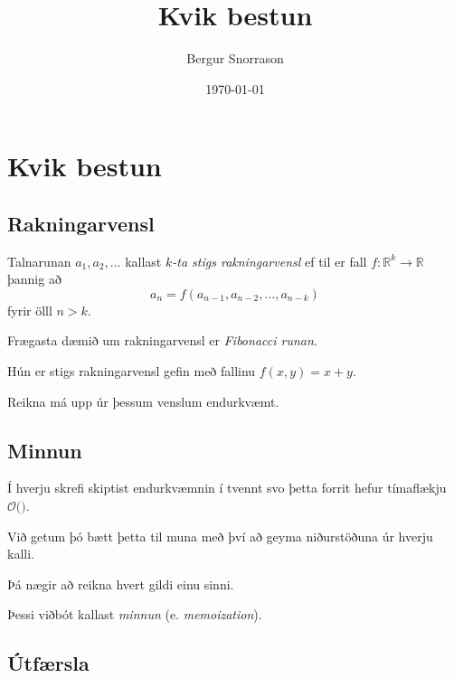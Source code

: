 \title{Kvik bestun}
\author{Bergur Snorrason}
\date{\today}



\frame{\titlepage}

\section{Kvik bestun}
\subsection{Rakningarvensl}
{
    {
        \item<1-> Talnarunan $a_1, a_2, ...$ kallast \emph{$k$-ta stigs rakningarvensl} ef til er fall
            $f \colon \mathbb{R}^k \rightarrow \mathbb{R}$ þannig að
            \[
            a_n = f(a_{n - 1}, a_{n - 2}, ..., a_{n - k})
                \]
                fyrir ölll $n > k$.
        \item<2-> Frægasta dæmið um rakningarvensl er \emph{Fibonacci runan}.
        \item<3-> Hún er  stigs rakningarvensl gefin með fallinu $f(x, y) = x + y$.
        \item<5-> Reikna má upp úr þessum venslum endurkvæmt.
        \item<6->[] 
    }
}

\subsection{Minnun}
{
    {
        \item<1-> Í hverju skrefi skiptist endurkvæmnin í tvennt svo þetta forrit hefur tímaflækju $\mathcal{O}($$)$.
        \item<3-> Við getum þó bætt þetta til muna með því að geyma niðurstöðuna úr hverju kalli.
        \item<4-> Þá nægir að reikna hvert gildi einu sinni.
        \item<5-> Þessi viðbót kallast \emph{minnun} (e. \emph{memoization}).
    }
}

\subsection{Útfærsla}
{
}

